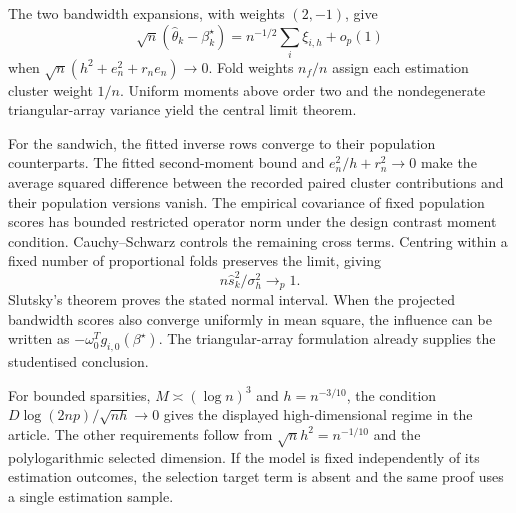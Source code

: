 The two bandwidth expansions, with weights $(2,-1)$, give
\[
 \sqrt n(\widehat\theta_k-\beta_k^\star)
       =n^{-1/2}\sum_i\xi_{i,h}+o_p(1)
\]
when $\sqrt n(h^2+e_n^2+r_ne_n)\to0$. Fold weights $n_f/n$
assign each estimation cluster weight $1/n$. Uniform moments above
order two and the nondegenerate triangular-array variance yield the
central limit theorem.

For the sandwich, the fitted inverse rows converge to their
population counterparts. The fitted second-moment bound and
$e_n^2/h+r_n^2\to0$ make the average squared difference between
the recorded paired cluster contributions and their population
versions vanish. The empirical covariance of fixed population scores
has bounded restricted operator norm under the design contrast
moment condition. Cauchy--Schwarz controls the remaining cross terms.
Centring within a fixed number of proportional folds preserves the
limit, giving
\[
 n\widehat s_k^2/\sigma_h^2\longrightarrow_p1.
\]
Slutsky's theorem proves the stated normal interval. When the
projected bandwidth scores also converge uniformly in mean square,
the influence can be written as
$-\omega_0^Tg_{i,0}(\beta^\star)$. The triangular-array formulation
already supplies the studentised conclusion.

For bounded sparsities, $M\asymp(\log n)^3$ and $h=n^{-3/10}$,
the condition $D\log(2np)/\sqrt{nh}\to0$ gives the displayed
high-dimensional regime in the article. The other requirements follow
from $\sqrt n h^2=n^{-1/10}$ and the polylogarithmic selected
dimension. If the model is fixed independently of its estimation
outcomes, the selection target term is absent and the same proof
uses a single estimation sample.
